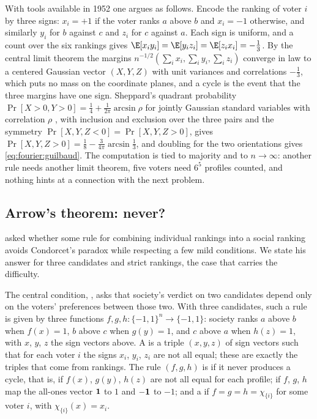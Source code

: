 \begin{refsection}
With tools available in 1952 one argues as follows. Encode the ranking of voter $i$ by three signs: $x_i=+1$ if the voter ranks $a$ above $b$ and $x_i=-1$ otherwise, and similarly $y_i$ for $b$ against $c$ and $z_i$ for $c$ against $a$. Each sign is uniform, and a count over the six rankings gives $\E[x_iy_i]=\E[y_iz_i]=\E[z_ix_i]=-\frac13$. By the central limit theorem the margins $n^{-1/2}(\sum_ix_i,\sum_iy_i,\sum_iz_i)$ converge in law to a centered Gaussian vector $(X,Y,Z)$ with unit variances and correlations $-\frac13$, which puts no mass on the coordinate planes, and a cycle is the event that the three margins have one sign. Sheppard's quadrant probability $\Pr[X>0,Y>0]=\frac14+\frac1{2\pi}\arcsin\rho$ for jointly Gaussian standard variables with correlation $\rho$ \parencite{Sheppard1899}, with inclusion and exclusion over the three pairs and the symmetry $\Pr[X,Y,Z<0]=\Pr[X,Y,Z>0]$, gives $\Pr[X,Y,Z>0]=\frac18-\frac{3}{4\pi}\arcsin\frac13$, and doubling for the two orientations gives \eqref{eq:fourier:guilbaud}. The computation is tied to majority and to $n\to\infty$: another rule needs another limit theorem, five voters need $6^5$ profiles counted, and nothing hints at a connection with the next problem.

\subsection{Arrow's theorem: never?}\label{sec:fourier:arrow}

\Textcite{Arrow1951} asked whether some rule for combining individual rankings into a social ranking avoids Condorcet's paradox while respecting a few mild conditions. We state his answer for three candidates and strict rankings, the case that carries the difficulty.

The central condition, , asks that society's verdict on two candidates depend only on the voters' preferences between those two. With three candidates, such a rule is given by three functions $f,g,h\colon\{-1,1\}^n\to\{-1,1\}$: society ranks $a$ above $b$ when $f(x)=1$, $b$ above $c$ when $g(y)=1$, and $c$ above $a$ when $h(z)=1$, with $x$, $y$, $z$ the sign vectors above. A  is a triple $(x,y,z)$ of sign vectors such that for each voter $i$ the signs $x_i$, $y_i$, $z_i$ are not all equal; these are exactly the triples that come from rankings. The rule $(f,g,h)$ is  if it never produces a cycle, that is, if $f(x)$, $g(y)$, $h(z)$ are not all equal for each profile;  if $f$, $g$, $h$ map the all-ones vector $\mathbf{1}$ to $1$ and $-\mathbf{1}$ to $-1$; and a  if $f=g=h=\chi_{\{i\}}$ for some voter $i$, with $\chi_{\{i\}}(x)=x_i$.


\end{refsection}
